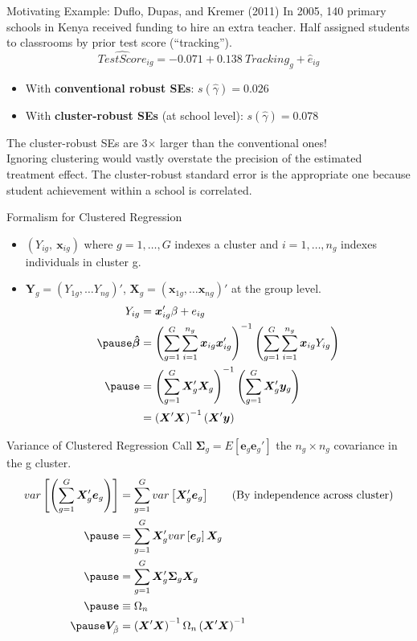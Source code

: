 \documentclass[aspectratio=169]{beamer}
\numberwithin{equation}{section}
\begin{document}
\begin{frame}{Motivating Example: Duflo, Dupas, and Kremer (2011)}
In 2005, 140 primary schools in Kenya received funding to hire an extra teacher. Half assigned students to classrooms by prior test score (``tracking'').
$$\widehat{TestScore}_{ig}=-0.071+0.138\ Tracking_g+\hat{e}_{ig}$$
\pause
\begin{itemize}
\item With \textbf{conventional robust SEs}: $s(\hat{\gamma})=0.026$
\item With \textbf{cluster-robust SEs} (at school level): $s(\hat{\gamma})=0.078$
\end{itemize}
\pause
\medskip
The cluster-robust SEs are \alert{3$\times$ larger} than the conventional ones!\\[6pt]
Ignoring clustering would vastly overstate the precision of the estimated treatment effect.  The cluster-robust standard error is the appropriate one because student achievement within a school is correlated.
\end{frame}

\begin{frame}{Formalism for Clustered Regression}
\begin{itemize}
\item $(Y_{ig},\ \bm{x}_{ig})$ where $g=1, \ldots, G$ indexes a cluster and $i=1,\ldots, n_g$ indexes individuals in cluster g. \pause
\item $\bm{Y}_g=(Y_{1g},\ldots Y_{ng})'$, $\bm{X}_g=(\bm{x}_{1g},\ldots \bm{x}_{ng})'$ at the group level. \pause
\begin{align*}
Y_{ig}&=\bm{x}_{ig}'\beta+e_{ig}\\ \pause
\bm{\hat{\beta}}&=\left(\sum_{g=1}^G \sum_{i=1}^{n_g}\bm{x}_{ig}\bm{x}_{ig}'\right)^{-1}\left(\sum_{g=1}^G \sum_{i=1}^{n_g}\bm{x}_{ig}Y_{ig}\right)\\ \pause
&=\left(\sum_{g=1}^G \bm{X}'_{g}\bm{X}_{g}\right)^{-1}\left(\sum_{g=1}^G \bm{X}'_{g}\bm{y}_{g}\right)\\
&=\left(\bm{X}'\bm{X}\right)^{-1}\left(\bm{X}'\bm{y}\right)
\end{align*}

\end{itemize}
\end{frame}



\begin{frame}{Variance of Clustered Regression}
Call $\bm{\Sigma}_g=E\left[\bm{e}_g\bm{e}_g'\right]$ the $n_g\times n_g$ covariance in the g cluster. \pause
\begin{align*}
var\left[\left(\sum_{g=1}^G \bm{X}_g'\bm{e}_g\right)\right]&=\sum_{g=1}^G var\left[\bm{X}_g'\bm{e}_g\right] \tag{By independence across cluster}\\ \pause
&=\sum_{g=1}^G \bm{X}_g'var\left[\bm{e}_g\right]\bm{X}_g\\ \pause
&=\sum_{g=1}^G \bm{X}_g'\bm{\Sigma}_g\bm{X}_g\\ \pause
&\equiv \Omega_n\\ \pause
\bm{V}_{\hat{\beta}}&=\left(\bm{X}'\bm{X}\right)^{-1}\Omega_n\left(\bm{X}'\bm{X}\right)^{-1}
\end{align*}
\end{frame}
\end{document}
